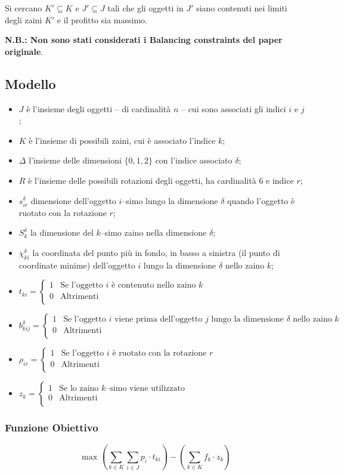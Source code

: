 \documentclass{scrartcl}
\newcommand{\MutliLineEquation}[3]{ 
	\ensuremath{
		#1 = \left\{
		\begin{array}{ll}
		1& \text{#2} \\
		0& \text{#3} \\
		\end{array}
		\right.
	}
}
\begin{document}
Si cercano $K' \subseteq K$ e $J' \subseteq J$ tali che gli oggetti in $J'$ siano contenuti nei limiti degli zaini $K'$ e il profitto sia massimo.


\textbf{N.B.: Non sono stati considerati i Balancing constraints del paper originale}.

\subsection{Modello}
\label{sec:original:model}
\begin{itemize}
	\item $J$ è l'insieme degli oggetti -- di cardinalità $n$ -- cui sono associati gli indici $i$ e $j$;
	\item $K$ è l'insieme di possibili zaini, cui è associato l'indice $k$;
	\item $\Delta$ l'insieme delle dimensioni $\{0,1,2\}$ con l'indice associato $\delta$;
	\item $R$ è l'insieme delle possibili rotazioni degli oggetti, ha cardinalità $6$ e indice $r$;
	\item $s_{ir}^\delta$ dimensione dell'oggetto $i$--simo lungo la dimensione $\delta$ quando l'oggetto è ruotato con la rotazione $r$;
	\item $S_{k}^\delta$ la dimensione del $k$--simo zaino nella dimensione $\delta$;
	\item $\chi_{ki}^\delta$ la coordinata del punto più in fondo, in basso a sinistra  (il punto di coordinate minime) dell'oggetto $i$ lungo la dimensione $\delta$ nello zaino $k$;
	\item \MutliLineEquation{t_{ki}}{Se l'oggetto $i$ è contenuto nello zaino $k$}{Altrimenti}
	\item \MutliLineEquation{b_{kij}^\delta}{Se l'oggetto $i$ viene prima dell'oggetto $j$ lungo la dimensione $\delta$ nello zaino $k$}{Altrimenti}
	\item \MutliLineEquation{\rho_{ir}}{Se l'oggetto $i$ è ruotato con la rotazione $r$}{Altrimenti}
	\item \MutliLineEquation{z_k}{Se lo zaino $k$--simo viene utilizzato}{Altrimenti}
	
\end{itemize}



\subsubsection{Funzione Obiettivo}
\begin{equation}
\text{ max }\left(\sum_{k \in K} \sum_{i \in J} p_i \cdot t_{ki}\right) - \left(\sum_{k \in K} f_k \cdot z_k\right)
\end{equation}
\end{document}
